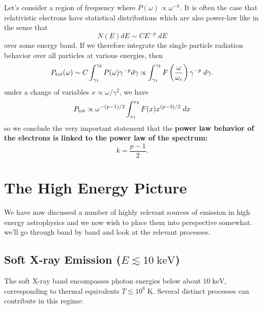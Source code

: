 Let's consider a region of frequency where $P(\omega) \propto \omega^{-k}$. It is often the case that relativistic electrons have statistical distributions which are also power-law like in the sense that
\[
N(E) dE \sim CE^{-p}\; dE
\]
over some energy band. If we therefore integrate the single particle radiation behavior over all particles at various energies, then
\[
P_{\rm tot}(\omega) \sim C\int_{\gamma_1}^{\gamma_2} P(\omega) \gamma^{-p} d\gamma \propto \int_{\gamma_1}^{\gamma_2} F\left(\frac{\omega}{\omega_c}\right) \gamma^{-p}\;d\gamma.
\]
under a change of variables $x \propto \omega/\gamma^2$, we have
\[
P_{\rm tot} \propto \omega^{-(p-1)/2} \int_{x_1}^{x_2} F(x)x^{(p-3)/2} \;dx
\]
so we conclude the very important statement that the \textbf{power law behavior of the electrons is linked to the power law of the spectrum:}
\[
k = \frac{p-1}{2}.
\]

\section{The High Energy Picture}

We have now discussed a number of highly relevant sources of emission in high energy astrophysics and we now wish to place them into perspective somewhat. we'll go through band by band and look at the relevant processes.

\subsection{Soft X-ray Emission ($E \lesssim 10\;\mathrm{keV}$)}

The soft X-ray band encompasses photon energies below about $10\;\mathrm{keV}$,
corresponding to thermal equivalents $T \lesssim 10^8\;\mathrm{K}$.
Several distinct processes can contribute in this regime:

